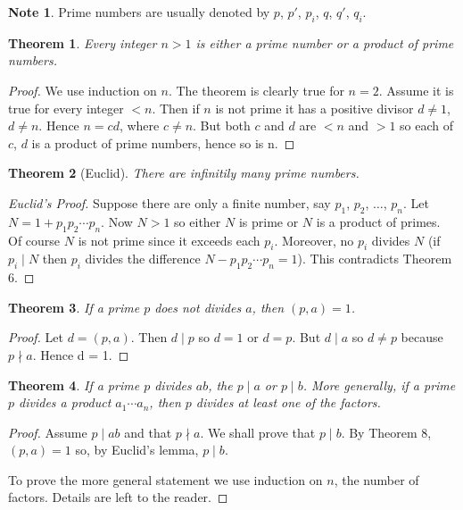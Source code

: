 \documentclass[11pt]{article}
\newtheorem{theorem}{Theorem}
\theoremstyle{definition}
\newtheorem*{note}{Note}
\begin{document}
\begin{note}
  Prime numbers are usually denoted by \(p\), \(p'\), \(p_{i}\), \(q\), \(q'\), \(q_{i}\).
\end{note}

\begin{theorem}
  Every integer \(n > 1\) is either a prime number or a  product of prime numbers.
\end{theorem}

\begin{proof}
  We use induction on \(n\). The theorem is clearly true for \(n = 2\). Assume
  it is true for every integer \(<n\). Then if \(n\) is not prime it has a positive divisor
  \(d \neq 1\), \(d \neq n\). Hence \(n = cd\), where \(c \neq n\). But both \(c\) and \(d\)
  are \(<n\) and \(>1\) so each of \(c\), \(d\) is a product of prime numbers, hence so is n.
\end{proof}

\begin{theorem}[Euclid]
  There are infinitily many prime numbers.
\end{theorem}

\begin{proof}[Euclid's Proof]
  Suppose there are only a finite number, say \(p_{1}\), \(p_{2}\), \(\ldots\), \(p_{n}\).
  Let \(N = 1 + p_{1}p_{2}\cdots p_{n}\). Now \(N > 1\) so either \(N\) is prime or \(N\)
  is a product of primes. Of course \(N\) is not prime since it exceeds each \(p_{i}\).
  Moreover, no \(p_{i}\) divides \(N\) (if \(p_{i}\mid N\) then \(p_{i}\) divides the difference
  \(N - p_{1}p_{2}\cdots p_{n}=1\)). This contradicts Theorem 6.
\end{proof}

\begin{theorem}
  If a prime \(p\) does not divides \(a\), then \((p, a) = 1\).
\end{theorem}
\begin{proof}
  Let \(d = (p, a)\). Then \(d \mid p\) so \(d = 1\) or \(d = p\). But \(d \mid a\) so \(d \neq p\)
  because \(p \nmid a\). Hence d = 1.
\end{proof}

\begin{theorem}
  If a prime \(p\) divides \(ab\), the \(p \mid a\) or \(p \mid b\). More generally, if a
  prime \(p\) divides a product \(a_{1}\cdots a_{n}\), then \(p\) divides at least one of the factors.
\end{theorem}
\begin{proof}
  Assume \(p \mid ab\) and that \(p \nmid a\). We shall prove that \(p \mid b\). By Theorem 8,
  \((p, a) = 1\) so, by Euclid's lemma, \(p \mid b\).

  To prove the more general statement we use induction on \(n\), the number of factors. Details are left to the reader.
\end{proof}
\end{document}
